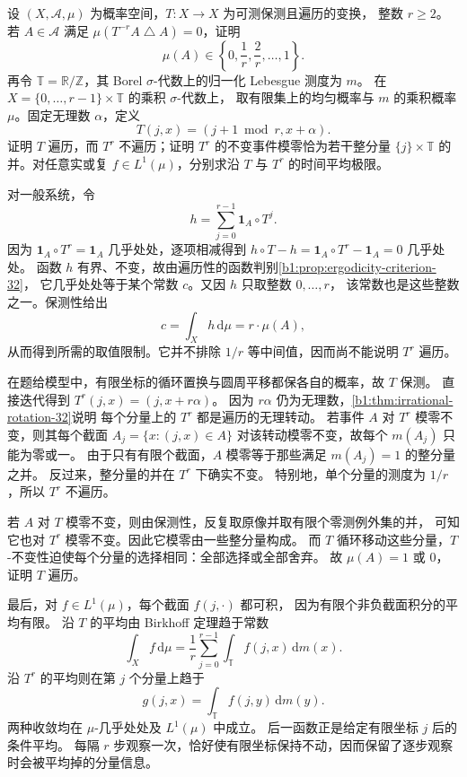 \begin{optionalexercise}\label{b1:ex:32-powers-periodic-factor}
设 \((X,\mathcal A,\mu)\) 为概率空间，\(T:X\to X\) 为可测保测且遍历的变换，
整数 \(r\geq2\)。若 \(A\in\mathcal A\) 满足 \(\mu(T^{-r}A\mathbin{\triangle}A)=0\)，证明
\[
 \mu(A)\in\left\{0,\frac1r,\frac2r,\ldots,1\right\}.
\]
再令 \(\mathbb T=\mathbb R/\mathbb Z\)，其 Borel \(\sigma\)-代数上的归一化 Lebesgue 测度为 \(m\)。
在 \(X=\{0,\ldots,r-1\}\times\mathbb T\) 的乘积 \(\sigma\)-代数上，
取有限集上的均匀概率与 \(m\) 的乘积概率 \(\mu\)。固定无理数 \(\alpha\)，定义
\[
 T(j,x)=(j+1\bmod r,x+\alpha).
\]
证明 \(T\) 遍历，而 \(T^r\) 不遍历；证明 \(T^r\) 的不变事件模零恰为若干整分量
\(\{j\}\times\mathbb T\) 的并。对任意实或复 \(f\in L^1(\mu)\)，分别求沿 \(T\) 与 \(T^r\) 的时间平均极限。
\end{optionalexercise}
\begin{solution}
对一般系统，令
\[
 h=\sum_{j=0}^{r-1}\mathbf1_A\circ T^j.
\]
因为 \(\mathbf1_A\circ T^r=\mathbf1_A\) 几乎处处，逐项相减得到
\(h\circ T-h=\mathbf1_A\circ T^r-\mathbf1_A=0\) 几乎处处。
函数 \(h\) 有界、不变，故由遍历性的函数判别\cref{b1:prop:ergodicity-criterion-32}，
它几乎处处等于某个常数 \(c\)。又因 \(h\) 只取整数 \(0,\ldots,r\)，
该常数也是这些整数之一。保测性给出
\[
 c=\int_Xh\,\mathrm d\mu=r\cdot\mu(A),
\]
从而得到所需的取值限制。它并不排除 \(1/r\) 等中间值，因而尚不能说明 \(T^r\) 遍历。

在题给模型中，有限坐标的循环置换与圆周平移都保各自的概率，故 \(T\) 保测。
直接迭代得到 \(T^r(j,x)=(j,x+r\alpha)\)。
因为 \(r\alpha\) 仍为无理数，\cref{b1:thm:irrational-rotation-32}说明
每个分量上的 \(T^r\) 都是遍历的无理转动。
若事件 \(A\) 对 \(T^r\) 模零不变，则其每个截面
\(A_j=\{x:(j,x)\in A\}\) 对该转动模零不变，故每个 \(m(A_j)\) 只能为零或一。
由于只有有限个截面，\(A\) 模零等于那些满足 \(m(A_j)=1\) 的整分量之并。
反过来，整分量的并在 \(T^r\) 下确实不变。
特别地，单个分量的测度为 \(1/r\)，所以 \(T^r\) 不遍历。

若 \(A\) 对 \(T\) 模零不变，则由保测性，反复取原像并取有限个零测例外集的并，
可知它也对 \(T^r\) 模零不变。因此它模零由一些整分量构成。
而 \(T\) 循环移动这些分量，\(T\)-不变性迫使每个分量的选择相同：全部选择或全部舍弃。
故 \(\mu(A)=1\) 或 \(0\)，证明 \(T\) 遍历。

最后，对 \(f\in L^1(\mu)\)，每个截面 \(f(j,\cdot)\) 都可积，
因为有限个非负截面积分的平均有限。
沿 \(T\) 的平均由 Birkhoff 定理趋于常数
\[
 \int_Xf\,\mathrm d\mu
 =\frac1r\sum_{j=0}^{r-1}\int_{\mathbb T}f(j,x)\,\mathrm dm(x).
\]
沿 \(T^r\) 的平均则在第 \(j\) 个分量上趋于
\[
 g(j,x)=\int_{\mathbb T}f(j,y)\,\mathrm dm(y).
\]
两种收敛均在 \(\mu\)-几乎处处及 \(L^1(\mu)\) 中成立。
后一函数正是给定有限坐标 \(j\) 后的条件平均。
每隔 \(r\) 步观察一次，恰好使有限坐标保持不动，因而保留了逐步观察时会被平均掉的分量信息。
\end{solution}
